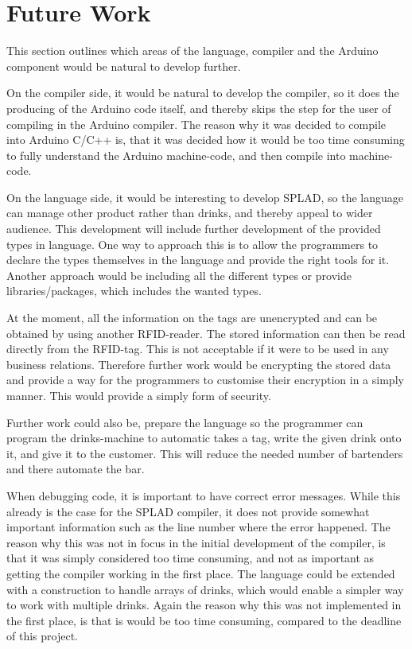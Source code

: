 \section{Future Work} %
This section outlines which areas of the language, compiler and the Arduino component would be natural to develop further.

On the compiler side, it would be natural to develop the compiler, so it does the producing of the Arduino code itself, and thereby skips the step for the user of compiling in the Arduino compiler. The reason why it was decided to compile into Arduino C/C++ is, that it was decided how it would be too time consuming to fully understand the Arduino machine-code, and then compile into machine-code.

On the language side, it would be interesting to develop SPLAD, so the language can manage other product rather than drinks, and thereby appeal to wider audience. This development will include further development of the provided types in language. One way to approach this is to allow the programmers to declare the types themselves in the language and provide the right tools for it. Another approach would be including all the different types or provide libraries/packages, which includes the wanted types.

At the moment, all the information on the tags are unencrypted and can be obtained by using another RFID-reader. The stored information can then be read directly from the RFID-tag. This is not acceptable if it were to be used in any business relations. Therefore further work would be encrypting the stored data and provide a way for the programmers to customise their encryption in a simply manner. This would provide a simply form of security.

Further work could also be, prepare the language so the programmer can program the drinks-machine to automatic takes a tag, write the given drink onto it, and give it to the customer. This will reduce the needed number of bartenders and there automate the bar.

When debugging code, it is important to have correct error messages. While this already is the case for the SPLAD compiler, it does not provide somewhat important information such as the line number where the error happened. The reason why this was not in focus in the initial development of the compiler, is that it was simply considered too time consuming, and not as important as getting the compiler working in the first place. The language could be extended with a construction to handle arrays of drinks, which would enable a simpler way to work with multiple drinks. Again the reason why this was not implemented in the first place, is that is would be too time consuming, compared to the deadline of this project.

